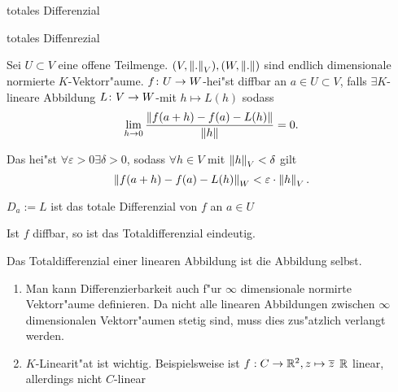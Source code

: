 \documentclass[class=article, crop=false]{standalone}
\begin{document}
\begin{zettel}{totales Differenzial}
\begin{flashcard}[]{}
	\begin{question}
		totales Diffenrezial
	\end{question}
	\begin{definition}
		Sei $U \subset  V$ eine offene Teilmenge. $(V,\left\|.\right\|_V), (W,\left\|.\right\|)$ sind endlich dimensionale normierte $K$-Vektorr"aume. $f \colon U\to W$-hei"st diffbar an $a \in  U \subset  V$, falls $\exists  K$-lineare Abbildung $L \colon V\to W$-mit $h \mapsto L (h)$ sodass
		\[
			\lim_{h \to 0} \frac{ \left\|f (a+h)- f (a)- L (h)\right\|}{ \left\|h\right\|} =0
		.\]

		Das hei"st $\forall\varepsilon>0 \exists\delta>0$, sodass $\forall h \in V$ mit $\left\|h\right\|_V < \delta$ gilt
		\[
			\left\| f (a +h) - f (a)- L (h)\right\|_W < \varepsilon \cdot  \left\|h\right\|_V
		.\]

		$D_a := L $ ist das totale Differenzial von $f$  an $a \in  U$
	\end{definition}
\end{flashcard}

\begin{remark}
	Ist $f$ diffbar, so ist das Totaldifferenzial eindeutig.
\end{remark}

\begin{remark}
	Das Totaldifferenzial einer linearen Abbildung ist die Abbildung selbst.
\end{remark}

\begin{remark}
	\begin{enumerate}
		\item Man kann Differenzierbarkeit auch f"ur $\infty$ dimensionale normirte Vektorr"aume definieren. Da nicht alle linearen Abbildungen zwischen $\infty$ dimensionalen Vektorr"aumen stetig sind, muss dies zus"atzlich verlangt werden.
		\item $K$-Linearit"at ist wichtig. Beispielsweise ist $f: C \to \mathbb{R}^2, z \mapsto \overline{z}$ $\mathbb{R} $ linear, allerdings nicht $C $-linear
	\end{enumerate}
\end{remark}

\end{zettel}
\end{document}
